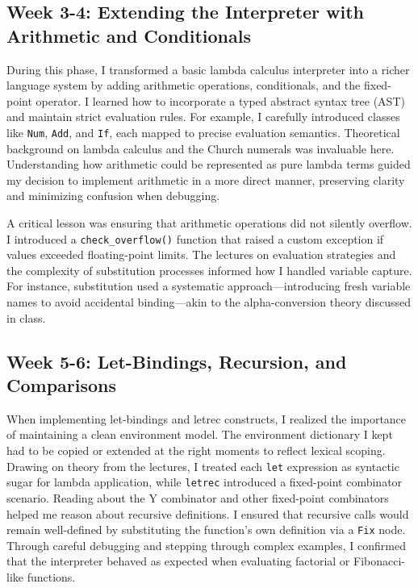 \documentclass{article}
\theoremstyle{theorem}
\theoremstyle{definition}
\theoremstyle{remark}
\begin{document}
\subsection*{Week 3-4: Extending the Interpreter with Arithmetic and Conditionals}

During this phase, I transformed a basic lambda calculus interpreter into a richer language system by adding arithmetic operations, conditionals, and the fixed-point operator. I learned how to incorporate a typed abstract syntax tree (AST) and maintain strict evaluation rules. For example, I carefully introduced classes like \texttt{Num}, \texttt{Add}, and \texttt{If}, each mapped to precise evaluation semantics. Theoretical background on lambda calculus and the Church numerals was invaluable here. Understanding how arithmetic could be represented as pure lambda terms guided my decision to implement arithmetic in a more direct manner, preserving clarity and minimizing confusion when debugging.

A critical lesson was ensuring that arithmetic operations did not silently overflow. I introduced a \texttt{check\_overflow()} function that raised a custom exception if values exceeded floating-point limits. The lectures on evaluation strategies and the complexity of substitution processes informed how I handled variable capture. For instance, substitution used a systematic approach—introducing fresh variable names to avoid accidental binding—akin to the alpha-conversion theory discussed in class.

\subsection*{Week 5-6: Let-Bindings, Recursion, and Comparisons}

When implementing let-bindings and letrec constructs, I realized the importance of maintaining a clean environment model. The environment dictionary I kept had to be copied or extended at the right moments to reflect lexical scoping. Drawing on theory from the lectures, I treated each \texttt{let} expression as syntactic sugar for lambda application, while \texttt{letrec} introduced a fixed-point combinator scenario. Reading about the Y combinator and other fixed-point combinators helped me reason about recursive definitions. I ensured that recursive calls would remain well-defined by substituting the function’s own definition via a \texttt{Fix} node. Through careful debugging and stepping through complex examples, I confirmed that the interpreter behaved as expected when evaluating factorial or Fibonacci-like functions.
\end{document}
